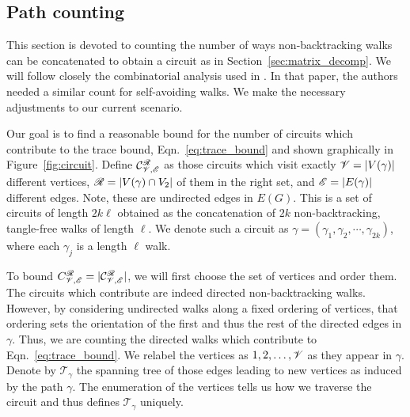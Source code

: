 \subsection{Path counting}
\label{sec:path_counting}

This section is devoted to counting
the number of ways non-backtracking
walks can be concatenated to obtain a circuit as in 
Section~\ref{sec:matrix_decomp}.
We will follow closely the combinatorial analysis used in 
\citet*{brito2016}. 
In that paper, the authors needed a similar count for 
self-avoiding walks. 
We make the necessary adjustments to our current scenario.

Our goal is to find a reasonable bound for the number of circuits which
contribute to the trace bound, 
Eqn.~\eqref{eq:trace_bound} and shown graphically in Figure~\ref{fig:circuit}.
Define $\mathcal{C}_{\mathscr{V}, \mathscr{E}}^{\mathscr{R}}$ as those circuits
which visit exactly 
$\mathscr{V} = |V(\gamma)|$ different vertices, 
$\mathscr{R} = |V(\gamma) \cap V_2|$ of them in the right set, and
$\mathscr{E} = |E(\gamma)|$ different edges. Note, these are undirected edges in $E(G)$.
This is a set of circuits of length $2 k \ell$ obtained as the
concatenation of $2k$ non-backtracking,
tangle-free walks of length
$\ell$.
We denote such a circuit as
$\gamma= ( \gamma_1,\gamma_2,\cdots, \gamma_{2k} )$,
where each $\gamma_j$ is a length $\ell$ walk.

To bound $C_{\mathscr{V}, \mathscr{E}}^{\mathscr{R}} = | \mathcal{C}_{\mathscr{V}, \mathscr{E}}^{\mathscr{R}} |$,
we will first choose the set of vertices and order them.
The circuits which contribute are indeed directed non-backtracking walks.
However, by considering undirected walks along a fixed ordering of vertices,
that ordering sets the orientation of the first and thus the rest of the
directed edges in $\gamma$.
Thus, we are counting the directed walks which contribute to 
Eqn.~\eqref{eq:trace_bound}.
We relabel the
vertices as $1,2, \ldots, \mathscr{V}$ as they appear in $\gamma$.
Denote by $\mathcal{T}_{\gamma}$ 
the spanning tree of those edges
leading to new vertices
as induced by the path $\gamma$.
The enumeration of the vertices tells us how we
traverse the circuit
and thus defines $\mathcal{T}_{\gamma}$ uniquely.

